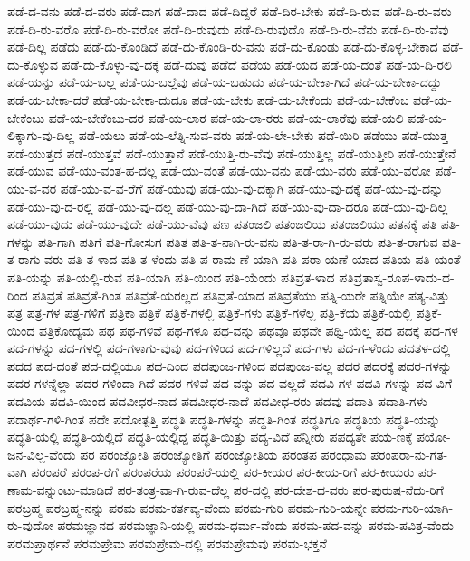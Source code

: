 {ಪಡೆ-ದ-ವನು
ಪಡೆ-ದ-ವರು
ಪಡೆ-ದಾಗ
ಪಡೆ-ದಾದ
ಪಡೆ-ದಿದ್ದರೆ
ಪಡೆ-ದಿರ-ಬೇಕು
ಪಡೆ-ದಿ-ರುವ
ಪಡೆ-ದಿ-ರು-ವರು
ಪಡೆ-ದಿ-ರು-ವರೊ
ಪಡೆ-ದಿ-ರು-ವರೋ
ಪಡೆ-ದಿ-ರುವುದು
ಪಡೆ-ದಿ-ರುವುದೊ
ಪಡೆ-ದಿ-ರು-ವೆನು
ಪಡೆ-ದಿ-ರು-ವೆವು
ಪಡೆ-ದಿಲ್ಲ
ಪಡೆದು
ಪಡೆ-ದು-ಕೊಂಡಿದೆ
ಪಡೆ-ದು-ಕೊಂಡಿ-ರು-ವನು
ಪಡೆ-ದು-ಕೊಂಡು
ಪಡೆ-ದು-ಕೊಳ್ಳ-ಬೇಕಾದ
ಪಡೆ-ದು-ಕೊಳ್ಳುವ
ಪಡೆ-ದು-ಕೊಳ್ಳು-ವು-ದಕ್ಕೆ
ಪಡೆ-ದುವು
ಪಡೆದೆ
ಪಡೆಯ
ಪಡೆ-ಯದ
ಪಡೆ-ಯ-ದಂತೆ
ಪಡೆ-ಯ-ದಿ-ರಲಿ
ಪಡೆ-ಯನ್ನು
ಪಡೆ-ಯ-ಬಲ್ಲ
ಪಡೆ-ಯ-ಬಲ್ಲೆವು
ಪಡೆ-ಯ-ಬಹುದು
ಪಡೆ-ಯ-ಬೇಕಾ-ಗಿದೆ
ಪಡೆ-ಯ-ಬೇಕಾ-ದದ್ದು
ಪಡೆ-ಯ-ಬೇಕಾ-ದರೆ
ಪಡೆ-ಯ-ಬೇಕಾ-ದುದೂ
ಪಡೆ-ಯ-ಬೇಕು
ಪಡೆ-ಯ-ಬೇಕೆಂದು
ಪಡೆ-ಯ-ಬೇಕೆಂಬ
ಪಡೆ-ಯ-ಬೇಕೆಂಬು
ಪಡೆ-ಯ-ಬೇಕೆಂಬು-ದರ
ಪಡೆ-ಯ-ಲಾರ
ಪಡೆ-ಯ-ಲಾ-ರರು
ಪಡೆ-ಯ-ಲಾರೆವು
ಪಡೆ-ಯಲಿ
ಪಡೆ-ಯ-ಲಿಕ್ಕಾಗು-ವು-ದಿಲ್ಲ
ಪಡೆ-ಯಲು
ಪಡೆ-ಯ-ಲೆತ್ನಿ-ಸುವ-ವರು
ಪಡೆ-ಯ-ಲೇ-ಬೇಕು
ಪಡೆ-ಯಿರಿ
ಪಡೆಯು
ಪಡೆ-ಯುತ್ತ
ಪಡೆ-ಯುತ್ತದೆ
ಪಡೆ-ಯುತ್ತವೆ
ಪಡೆ-ಯುತ್ತಾನೆ
ಪಡೆ-ಯುತ್ತಿ-ರು-ವೆವು
ಪಡೆ-ಯುತ್ತಿಲ್ಲ
ಪಡೆ-ಯುತ್ತೀರಿ
ಪಡೆ-ಯುತ್ತೇನೆ
ಪಡೆ-ಯುವ
ಪಡೆ-ಯು-ವಂತ-ಹ-ದಲ್ಲ
ಪಡೆ-ಯು-ವಂತೆ
ಪಡೆ-ಯು-ವನು
ಪಡೆ-ಯು-ವರು
ಪಡೆ-ಯು-ವರೋ
ಪಡೆ-ಯು-ವ-ವರ
ಪಡೆ-ಯು-ವ-ವ-ರೆಗೆ
ಪಡೆ-ಯುವು
ಪಡೆ-ಯು-ವು-ದಕ್ಕಾಗಿ
ಪಡೆ-ಯು-ವು-ದಕ್ಕೆ
ಪಡೆ-ಯು-ವು-ದನ್ನು
ಪಡೆ-ಯು-ವು-ದ-ರಲ್ಲಿ
ಪಡೆ-ಯು-ವು-ದಲ್ಲ
ಪಡೆ-ಯು-ವು-ದಾ-ಗಿದೆ
ಪಡೆ-ಯು-ವು-ದಾ-ದರೂ
ಪಡೆ-ಯು-ವು-ದಿಲ್ಲ
ಪಡೆ-ಯು-ವುದು
ಪಡೆ-ಯು-ವುದೇ
ಪಡೆ-ಯು-ವೆವು
ಪಣ
ಪತಂಜಲಿ
ಪತಂಜಲಿಯ
ಪತಂಜಲಿಯು
ಪತನಕ್ಕೆ
ಪತಿ
ಪತಿ-ಗಳನ್ನು
ಪತಿ-ಗಾಗಿ
ಪತಿಗೆ
ಪತಿ-ಗೋಸುಗ
ಪತಿತ
ಪತಿ-ತ-ನಾಗಿ-ರು-ವನು
ಪತಿ-ತ-ರಾ-ಗಿ-ರು-ವರು
ಪತಿ-ತ-ರಾಗುವ
ಪತಿ-ತ-ರಾಗು-ವರು
ಪತಿ-ತ-ಳಾದ
ಪತಿ-ತ-ಳೆಂದು
ಪತಿ-ಪ-ರಾಮ-ಣೆ-ಯಾಗಿ
ಪತಿ-ಪರಾ-ಯಣೆ-ಯಾದ
ಪತಿಯ
ಪತಿ-ಯಂತೆ
ಪತಿ-ಯನ್ನು
ಪತಿ-ಯಲ್ಲಿ-ರುವ
ಪತಿ-ಯಾಗಿ
ಪತಿ-ಯಿಂದ
ಪತಿ-ಯೆಂದು
ಪತಿವ್ರತ-ಳಾದ
ಪತಿವ್ರತಾಸ್ವ-ರೂಪ-ಳಾದು-ದ-ರಿಂದ
ಪತಿವ್ರತೆ
ಪತಿವ್ರತೆ-ಗಿಂತ
ಪತಿವ್ರತೆ-ಯರಲ್ಲದ
ಪತಿವ್ರತೆ-ಯಾದ
ಪತಿವ್ರತೆಯು
ಪತ್ನಿ-ಯರೇ
ಪತ್ನಿಯೇ
ಪತ್ಯ-ವಿತ್ತು
ಪತ್ರ
ಪತ್ರ-ಗಳ
ಪತ್ರ-ಗಳಿಗೆ
ಪತ್ರಿಕಾ
ಪತ್ರಿಕೆ
ಪತ್ರಿಕೆ-ಗಳಲ್ಲಿ
ಪತ್ರಿಕೆ-ಗಳು
ಪತ್ರಿಕೆ-ಗಳೆಲ್ಲ
ಪತ್ರಿ-ಕೆಯ
ಪತ್ರಿಕೆ-ಯಲ್ಲಿ
ಪತ್ರಿಕೆ-ಯಿಂದ
ಪತ್ರಿಕೋದ್ಯಮ
ಪಥ
ಪಥ-ಗಳಿವೆ
ಪಥ-ಗಳೂ
ಪಥ-ವನ್ನು
ಪಥವೂ
ಪಥವೇ
ಪಥ್ವಿ-ಯೆಲ್ಲ
ಪದ
ಪದಕ್ಕೆ
ಪದ-ಗಳ
ಪದ-ಗಳನ್ನು
ಪದ-ಗಳಲ್ಲಿ
ಪದ-ಗಳಾಗು-ವುವು
ಪದ-ಗಳಿಂದ
ಪದ-ಗಳಿಲ್ಲದೆ
ಪದ-ಗಳು
ಪದ-ಗ-ಳೆಂದು
ಪದತಳ-ದಲ್ಲಿ
ಪದದ
ಪದ-ದಂತೆ
ಪದ-ದಲ್ಲಿಯೂ
ಪದ-ದಿಂದ
ಪದಪುಂಜ-ಗಳಿಂದ
ಪದಪುಂಜ-ವಲ್ಲ
ಪದರ
ಪದರಕ್ಕೆ
ಪದರ-ಗಳನ್ನು
ಪದರ-ಗಳನ್ನೆಲ್ಲಾ
ಪದರ-ಗಳಿಂದಾ-ಗಿದೆ
ಪದರ-ಗಳಿವೆ
ಪದ-ವನ್ನು
ಪದ-ವಲ್ಲದೆ
ಪದವಿ-ಗಳ
ಪದವಿ-ಗಳನ್ನು
ಪದ-ವಿಗೆ
ಪದವಿಯ
ಪದವಿ-ಯಿಂದ
ಪದವೀಧರ-ನಾದ
ಪದವೀಧರ-ನಾದೆ
ಪದವೀಧ-ರರು
ಪದವು
ಪದಾತಿ
ಪದಾತಿ-ಗಳು
ಪದಾರ್ಥ-ಗಳಿ-ಗಿಂತ
ಪದೇ
ಪದೋತ್ಪತ್ತಿ
ಪದ್ಧತಿ
ಪದ್ಧತಿ-ಗಳನ್ನು
ಪದ್ಧತಿ-ಗಿಂತ
ಪದ್ಧತಿಗೂ
ಪದ್ಧತಿಯ
ಪದ್ಧತಿ-ಯನ್ನು
ಪದ್ಧತಿ-ಯಲ್ಲಿ
ಪದ್ಧತಿ-ಯಲ್ಲಿದೆ
ಪದ್ಧತಿ-ಯಲ್ಲಿದ್ದ
ಪದ್ಧತಿ-ಯಿತ್ತು
ಪದ್ಯ-ವಿದೆ
ಪನ್ನೀರು
ಪಪದ್ಯತೇ
ಪಯ-ಣಕ್ಕೆ
ಪಯೋ-ಜನ-ವಿಲ್ಲ-ವೆಂದು
ಪರ
ಪರಂಜ್ಯೋತಿ
ಪರಂಜ್ಯೋತಿಗೆ
ಪರಂಜ್ಯೋತಿಯ
ಪರಂತಪ
ಪರಂಧಾಮ
ಪರಂಪರಾ-ನು-ಗತ-ವಾಗಿ
ಪರಂಪರೆ
ಪರಂಪ-ರೆಗೆ
ಪರಂಪರೆಯ
ಪರಂಪರೆ-ಯಲ್ಲಿ
ಪರ-ಕೀಯರ
ಪರ-ಕೀಯ-ರಿಗೆ
ಪರ-ಕೀಯರು
ಪರ-ಣಾಮ-ವನ್ನುಂಟು-ಮಾಡಿದೆ
ಪರ-ತಂತ್ರ-ವಾ-ಗಿ-ರುವ-ದೆಲ್ಲ
ಪರ-ದಲ್ಲಿ
ಪರ-ದೇಶ-ದ-ವರು
ಪರ-ಪುರುಷ-ನೆದು-ರಿಗೆ
ಪರಬ್ರಹ್ಮ
ಪರಬ್ರಹ್ಮ-ನನ್ನು
ಪರಮ
ಪರಮ-ಕರ್ತವ್ಯ-ವೆಂದು
ಪರಮ-ಗುರಿ
ಪರಮ-ಗುರಿ-ಯನ್ನೇ
ಪರಮ-ಗುರಿ-ಯಾಗಿ-ರು-ವುದೋ
ಪರಮಜ್ಞಾನದ
ಪರಮಜ್ಞಾನಿ-ಯಲ್ಲಿ
ಪರಮ-ಧರ್ಮ-ವೆಂದು
ಪರಮ-ಪದ-ವನ್ನು
ಪರಮ-ಪವಿತ್ರ-ವೆಂದು
ಪರಮಪ್ರಾರ್ಥನೆ
ಪರಮಪ್ರೇಮ
ಪರಮಪ್ರೇಮ-ದಲ್ಲಿ
ಪರಮಪ್ರೇಮವು
ಪರಮ-ಭಕ್ತನೆ
}
